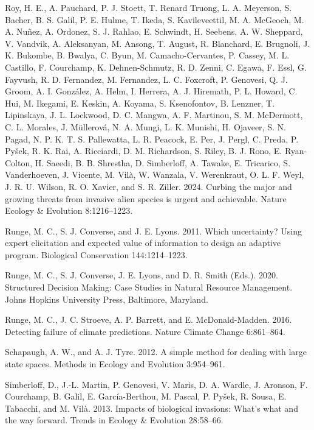 \documentclass[
  11pt,
  a4paper,
]{article}
\newlength{\cslhangindent}
\newenvironment{CSLReferences}[2] %
 {\begin{list}{}{%
  \setlength{\itemindent}{0pt}
  \setlength{\leftmargin}{0pt}
  \setlength{\parsep}{0pt}
  \ifodd #1
   \setlength{\leftmargin}{\cslhangindent}
   \setlength{\itemindent}{-1\cslhangindent}
  \fi
  \setlength{\itemsep}{#2\baselineskip}}}
 {\end{list}}
\begin{document}
\begin{CSLReferences}{1}{0}
Roy, H. E., A. Pauchard, P. J. Stoett, T. Renard Truong, L. A. Meyerson, S. Bacher, B. S. Galil, P. E. Hulme, T. Ikeda, S. Kavileveettil, M. A. McGeoch, M. A. Nuñez, A. Ordonez, S. J. Rahlao, E. Schwindt, H. Seebens, A. W. Sheppard, V. Vandvik, A. Aleksanyan, M. Ansong, T. August, R. Blanchard, E. Brugnoli, J. K. Bukombe, B. Bwalya, C. Byun, M. Camacho-Cervantes, P. Cassey, M. L. Castillo, F. Courchamp, K. Dehnen-Schmutz, R. D. Zenni, C. Egawa, F. Essl, G. Fayvush, R. D. Fernandez, M. Fernandez, L. C. Foxcroft, P. Genovesi, Q. J. Groom, A. I. González, A. Helm, I. Herrera, A. J. Hiremath, P. L. Howard, C. Hui, M. Ikegami, E. Keskin, A. Koyama, S. Ksenofontov, B. Lenzner, T. Lipinskaya, J. L. Lockwood, D. C. Mangwa, A. F. Martinou, S. M. McDermott, C. L. Morales, J. Müllerová, N. A. Mungi, L. K. Munishi, H. Ojaveer, S. N. Pagad, N. P. K. T. S. Pallewatta, L. R. Peacock, E. Per, J. Pergl, C. Preda, P. Pyšek, R. K. Rai, A. Ricciardi, D. M. Richardson, S. Riley, B. J. Rono, E. Ryan-Colton, H. Saeedi, B. B. Shrestha, D. Simberloff, A. Tawake, E. Tricarico, S. Vanderhoeven, J. Vicente, M. Vilà, W. Wanzala, V. Werenkraut, O. L. F. Weyl, J. R. U. Wilson, R. O. Xavier, and S. R. Ziller. 2024. Curbing the major and growing threats from invasive alien species is urgent and achievable. Nature Ecology \& Evolution 8:1216--1223.

Runge, M. C., S. J. Converse, and J. E. Lyons. 2011. Which uncertainty? Using expert elicitation and expected value of information to design an adaptive program. Biological Conservation 144:1214--1223.

Runge, M. C., S. J. Converse, J. E. Lyons, and D. R. Smith (Eds.). 2020. Structured {Decision Making}: {Case Studies} in {Natural Resource Management}. Johns Hopkins University Press, Baltimore, Maryland.

Runge, M. C., J. C. Stroeve, A. P. Barrett, and E. McDonald-Madden. 2016. Detecting failure of climate predictions. Nature Climate Change 6:861--864.

Schapaugh, A. W., and A. J. Tyre. 2012. A simple method for dealing with large state spaces. Methods in Ecology and Evolution 3:954--961.

Simberloff, D., J.-L. Martin, P. Genovesi, V. Maris, D. A. Wardle, J. Aronson, F. Courchamp, B. Galil, E. García-Berthou, M. Pascal, P. Pyšek, R. Sousa, E. Tabacchi, and M. Vilà. 2013. Impacts of biological invasions: What's what and the way forward. Trends in Ecology \& Evolution 28:58--66.


\end{CSLReferences}
\end{document}

